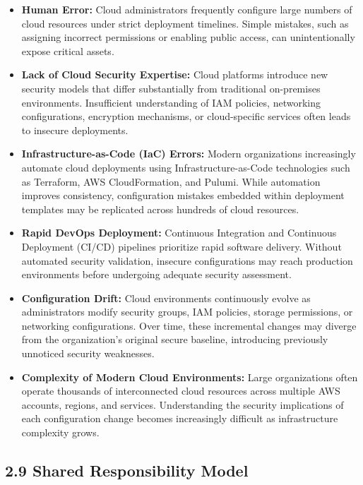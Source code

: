 \begin{itemize}
\tightlist
\item
  \textbf{Human Error:} Cloud administrators frequently configure large numbers of cloud resources under strict deployment timelines. Simple mistakes, such as assigning incorrect permissions or enabling public access, can unintentionally expose critical assets.\\
\item
  \textbf{Lack of Cloud Security Expertise:} Cloud platforms introduce new security models that differ substantially from traditional on-premises environments. Insufficient understanding of IAM policies, networking configurations, encryption mechanisms, or cloud-specific services often leads to insecure deployments.\\
\item
  \textbf{Infrastructure-as-Code (IaC) Errors:} Modern organizations increasingly automate cloud deployments using Infrastructure-as-Code technologies such as Terraform, AWS CloudFormation, and Pulumi. While automation improves consistency, configuration mistakes embedded within deployment templates may be replicated across hundreds of cloud resources.\\
\item
  \textbf{Rapid DevOps Deployment:} Continuous Integration and Continuous Deployment (CI/CD) pipelines prioritize rapid software delivery. Without automated security validation, insecure configurations may reach production environments before undergoing adequate security assessment.\\
\item
  \textbf{Configuration Drift:} Cloud environments continuously evolve as administrators modify security groups, IAM policies, storage permissions, or networking configurations. Over time, these incremental changes may diverge from the organization's original secure baseline, introducing previously unnoticed security weaknesses.\\
\item
  \textbf{Complexity of Modern Cloud Environments:} Large organizations often operate thousands of interconnected cloud resources across multiple AWS accounts, regions, and services. Understanding the security implications of each configuration change becomes increasingly difficult as infrastructure complexity grows.
\end{itemize}

\subsection{2.9 Shared Responsibility Model}

